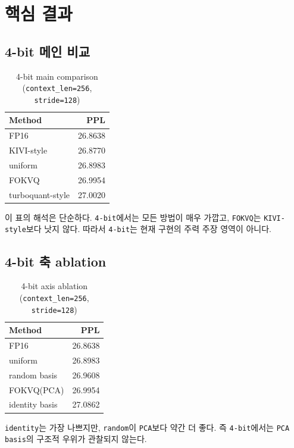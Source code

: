 \documentclass[11pt,a4paper]{article}
\begin{document}
\section{핵심 결과}

\subsection{4-bit 메인 비교}

\begin{table}[H]
\centering
\caption{4-bit main comparison (\texttt{context\_len=256}, \texttt{stride=128})}
\label{tab:4bit-main}
\small
\begin{tabular}{lr}
\toprule
\textbf{Method} & \textbf{PPL} \\
\midrule
FP16 & 26.8638 \\
KIVI-style & 26.8770 \\
uniform & 26.8983 \\
FOKVQ & 26.9954 \\
turboquant-style & 27.0020 \\
\bottomrule
\end{tabular}
\end{table}

이 표의 해석은 단순하다. \texttt{4-bit}에서는 모든 방법이 매우 가깝고, \texttt{FOKVQ}는 \texttt{KIVI-style}보다 낫지 않다. 따라서 \texttt{4-bit}는 현재 구현의 주력 주장 영역이 아니다.

\subsection{4-bit 축 ablation}

\begin{table}[H]
\centering
\caption{4-bit axis ablation (\texttt{context\_len=256}, \texttt{stride=128})}
\label{tab:4bit-axis}
\small
\begin{tabular}{lr}
\toprule
\textbf{Method} & \textbf{PPL} \\
\midrule
FP16 & 26.8638 \\
uniform & 26.8983 \\
random basis & 26.9608 \\
FOKVQ(PCA) & 26.9954 \\
identity basis & 27.0862 \\
\bottomrule
\end{tabular}
\end{table}

\texttt{identity}는 가장 나쁘지만, \texttt{random}이 \texttt{PCA}보다 약간 더 좋다. 즉 \texttt{4-bit}에서는 \texttt{PCA basis}의 구조적 우위가 관찰되지 않는다.
\end{document}
